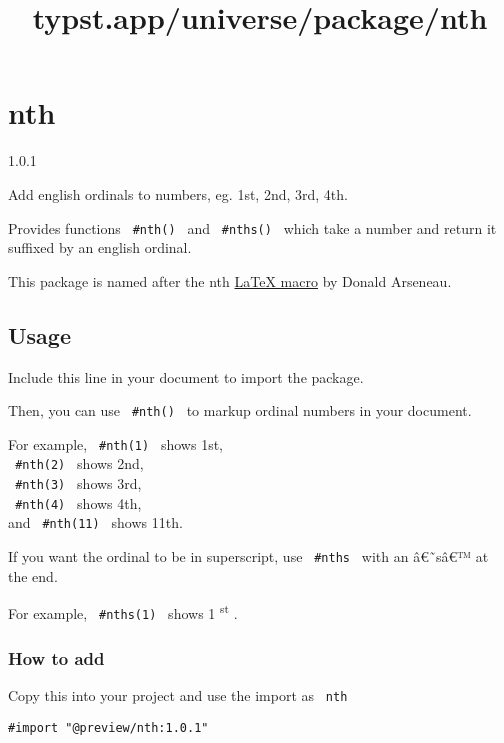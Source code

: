 \title{typst.app/universe/package/nth}

\label{banner}
\section{nth}\label{nth}

{ 1.0.1 }

Add english ordinals to numbers, eg. 1st, 2nd, 3rd, 4th.

\label{readme}
Provides functions \texttt{\ \#nth()\ } and \texttt{\ \#nths()\ } which
take a number and return it suffixed by an english ordinal.

This package is named after the nth
\href{https://ctan.org/pkg/nth}{LaTeX macro} by Donald Arseneau.

\subsection{Usage}\label{usage}

Include this line in your document to import the package.

\begin{Shaded}
\begin{Highlighting}[]
\end{Highlighting}
\end{Shaded}

Then, you can use \texttt{\ \#nth()\ } to markup ordinal numbers in your
document.

For example, \texttt{\ \#nth(1)\ } shows 1st,\\
\texttt{\ \#nth(2)\ } shows 2nd,\\
\texttt{\ \#nth(3)\ } shows 3rd,\\
\texttt{\ \#nth(4)\ } shows 4th,\\
and \texttt{\ \#nth(11)\ } shows 11th.

If you want the ordinal to be in superscript, use \texttt{\ \#nths\ }
with an â€˜sâ€™ at the end.

For example, \texttt{\ \#nths(1)\ } shows 1 \textsuperscript{st} .

\subsubsection{How to add}\label{how-to-add}

Copy this into your project and use the import as \texttt{\ nth\ }

\begin{verbatim}
#import "@preview/nth:1.0.1"
\end{verbatim}

